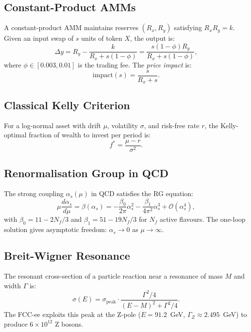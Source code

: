 \documentclass[12pt,a4paper]{article}
\begin{document}
\subsection{Constant-Product AMMs}

A constant-product AMM maintains reserves $(R_x, R_y)$ satisfying $R_x R_y = k$.
Given an input swap of $s$ units of token $X$, the output is:
\begin{equation}
\Delta y = R_y - \frac{k}{R_x + s(1-\phi)} = \frac{s(1-\phi) R_y}{R_x + s(1-\phi)},
\label{eq:amm-output}
\end{equation}
where $\phi \in [0.003, 0.01]$ is the trading fee.  The \emph{price impact} is:
\begin{equation}
\mathrm{impact}(s) = \frac{s}{R_x + s}.
\label{eq:impact}
\end{equation}

\subsection{Classical Kelly Criterion}

For a log-normal asset with drift $\mu$, volatility $\sigma$, and risk-free
rate $r$, the Kelly-optimal fraction of wealth to invest per period is:
\begin{equation}
f^* = \frac{\mu - r}{\sigma^2}.
\label{eq:kelly-classic}
\end{equation}

\subsection{Renormalisation Group in QCD}

The strong coupling $\alpha_s(\mu)$ in QCD satisfies the RG equation:
\begin{equation}
\mu \frac{d\alpha_s}{d\mu} = \beta(\alpha_s) = -\frac{\beta_0}{2\pi}\alpha_s^2 - \frac{\beta_1}{4\pi^2}\alpha_s^3 + \mathcal{O}(\alpha_s^4),
\label{eq:qcd-rg}
\end{equation}
with $\beta_0 = 11 - 2N_f/3$ and $\beta_1 = 51 - 19N_f/3$ for $N_f$ active
flavours.  The one-loop solution gives asymptotic freedom: $\alpha_s \to 0$ as
$\mu \to \infty$.

\subsection{Breit-Wigner Resonance}

The resonant cross-section of a particle reaction near a resonance of mass $M$
and width $\Gamma$ is:
\begin{equation}
\sigma(E) = \sigma_\mathrm{peak} \cdot \frac{\Gamma^2/4}{(E-M)^2 + \Gamma^2/4}.
\label{eq:breit-wigner}
\end{equation}
The FCC-ee exploits this peak at the Z-pole ($E = 91.2$~GeV, $\Gamma_Z \approx 2.495$~GeV)
to produce $6 \times 10^{12}$ Z bosons.
\end{document}
